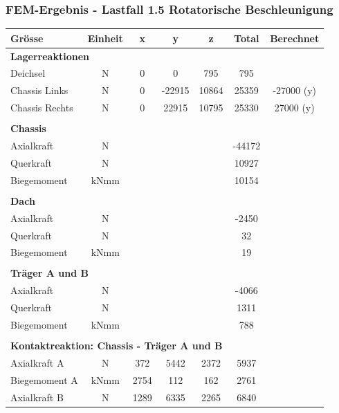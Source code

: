   \subsubsection{FEM-Ergebnis - Lastfall 1.5 Rotatorische Beschleunigung}
  \begin{table}[H]
  \centering
      \begin{threeparttable}
  \begin{tabular}{lcccccc}
  Grösse	&	Einheit	&	x	&	y	&	z	&	Total	&	Berechnet	\\	\hline
  \multicolumn{5}{l}{\textbf{Lagerreaktionen}}									&		&		\\	\thickhline
  Deichsel	&	N	&	0	&	0	&	795	&	795	&		\\
  Chassis Links	&	N	&	0	&	-22915	&	10864	&	25359	&	-27000 (y)\tnote{6} \\
  Chassis Rechts	&	N	&	0	&	22915	&	10795	&	25330	&	27000 (y)	\\	\hline	\\
  \multicolumn{5}{l}{\textbf{Chassis}}									&		&		\\	\thickhline
  Axialkraft	&	N	&		&		&		&	-44172	&		\\
  Querkraft	&	N	&		&		&		&	10927	&		\\
  Biegemoment	&	kNmm	&		&		&		&	10154	&		\\	\hline	\\
  \multicolumn{5}{l}{\textbf{Dach}}									&		&		\\	\thickhline
  Axialkraft	&	N	&		&		&		&	-2450	&		\\
  Querkraft	&	N	&		&		&		&	32	&		\\
  Biegemoment	&	kNmm	&		&		&		&	19	&		\\	\hline	\\
  \multicolumn{5}{l}{\textbf{Träger A und B}}													\\	\thickhline
  Axialkraft	&	N	&		&		&		&	-4066	&		\\
  Querkraft	&	N	&		&		&		&	1311	&		\\
  Biegemoment	&	kNmm	&		&		&		&	788	&		\\	\hline	\\
  \multicolumn{5}{l}{\textbf{Kontaktreaktion: Chassis - Träger A und B}}									&		&		\\	\thickhline
  Axialkraft A	&	N	&	372	&	5442	&	2372	&	5937	&		\\
  Biegemoment A	&	kNmm	&	2754	&	112	&	162	&	2761	&		\\
  Axialkraft B	&	N	&	1289	&	6335	&	2265	&	6840	&		\\

\end{tabular}
\end{threeparttable}
\end{table}
